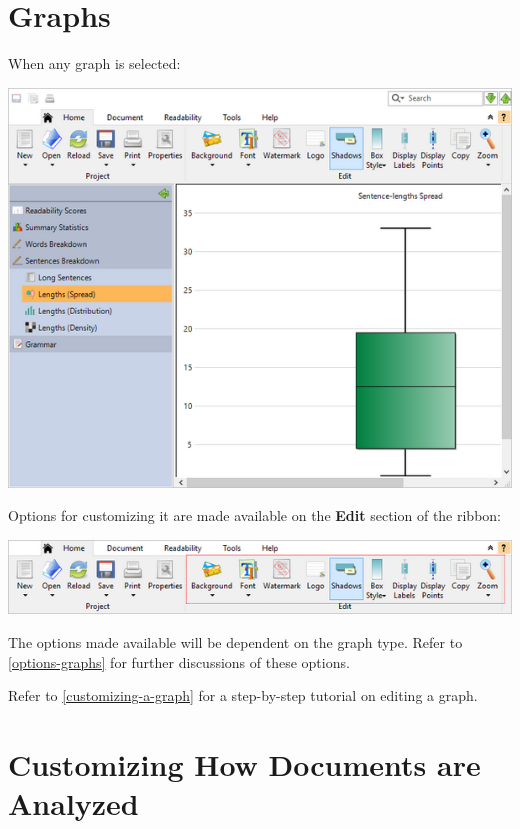 \documentclass[
]{book}
\theoremstyle{definition}
\theoremstyle{definition}
\theoremstyle{definition}
\theoremstyle{definition}
\theoremstyle{remark}
\begin{document}
\hypertarget{graphs}{%
\section{Graphs}\label{graphs}}

\begin{minipage}{\textwidth}
When any graph is selected:

\includegraphics{Images/SentenceBoxPlotSelected.png}

\end{minipage}

Options for customizing it are made available on the \textbf{Edit} section of the ribbon:

\includegraphics{Images/RibbonEditGraphs.png}

The options made available will be dependent on the graph type. Refer to \ref{options-graphs} for further discussions of these options.

Refer to \ref{customizing-a-graph} for a step-by-step tutorial on editing a graph.

\hypertarget{customizing-how-documents-are-analyzed}{%
\section{Customizing How Documents are Analyzed}\label{customizing-how-documents-are-analyzed}}
\end{document}

